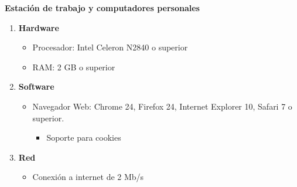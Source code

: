 
\textbf{Estación de trabajo y computadores personales}
\begin{enumerate}
\item \textbf{Hardware}
\begin{itemize}
\item Procesador: Intel Celeron N2840 o superior
\item RAM: 2 GB o superior
\end{itemize}
\item \textbf{Software}
\begin{itemize}
\item Navegador Web: Chrome 24, Firefox 24, Internet Explorer 10, Safari 7 o superior.
\begin{itemize}
\item Soporte para cookies
\end{itemize}
\end{itemize}

\item \textbf{Red}
\begin{itemize}
\item Conexión a internet de 2 Mb/s
\end{itemize}

\end{enumerate}



